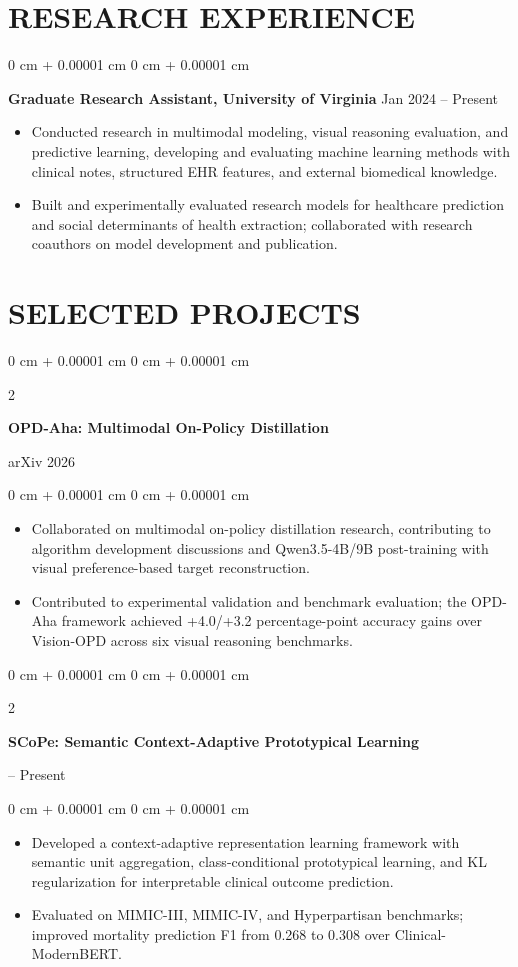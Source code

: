 \documentclass[10pt, letterpaper]{article}
\newenvironment{highlights}{
    \begin{itemize}[
        topsep=0.03 cm,
        parsep=0.03 cm,
        partopsep=0pt,
        itemsep=0pt,
        leftmargin=0 cm + 10pt
    ]
}{
    \end{itemize}
} %
\newenvironment{onecolentry}{
    \begin{adjustwidth}{
        0 cm + 0.00001 cm
    }{
        0 cm + 0.00001 cm
    }
}{
    \end{adjustwidth}
} %
\newenvironment{twocolentry}[2][]{
    \onecolentry
    \def\secondColumn{#2}
    \setcolumnwidth{\fill, 4.5 cm}
    \begin{paracol}{2}
}{
    \switchcolumn \raggedleft \secondColumn
    \end{paracol}
    \endonecolentry
} %
\begin{document}
\section{RESEARCH EXPERIENCE}
\begin{onecolentry}
\textbf{Graduate Research Assistant, University of Virginia} \hfill Jan 2024 -- Present
\begin{highlights}
\item Conducted research in multimodal modeling, visual reasoning evaluation, and predictive learning, developing and evaluating machine learning methods with clinical notes, structured EHR features, and external biomedical knowledge.
\item Built and experimentally evaluated research models for healthcare prediction and social determinants of health extraction; collaborated with research coauthors on model development and publication.
\end{highlights}
\end{onecolentry}
\section{SELECTED PROJECTS}

\begin{twocolentry}{arXiv 2026}
\textbf{OPD-Aha: Multimodal On-Policy Distillation}
\end{twocolentry}
\begin{onecolentry}
\begin{highlights}
\item Collaborated on multimodal on-policy distillation research, contributing to algorithm development discussions and Qwen3.5-4B/9B post-training with visual preference-based target reconstruction.
\item Contributed to experimental validation and benchmark evaluation; the OPD-Aha framework achieved +4.0/+3.2 percentage-point accuracy gains over Vision-OPD across six visual reasoning benchmarks.
\end{highlights}
\end{onecolentry}
\vspace{0.06 cm}

\begin{twocolentry}{2026 -- Present}
\textbf{SCoPe: Semantic Context-Adaptive Prototypical Learning}
\end{twocolentry}
\begin{onecolentry}
\begin{highlights}
\item Developed a context-adaptive representation learning framework with semantic unit aggregation, class-conditional prototypical learning, and KL regularization for interpretable clinical outcome prediction.
\item Evaluated on MIMIC-III, MIMIC-IV, and Hyperpartisan benchmarks; improved mortality prediction F1 from 0.268 to 0.308 over Clinical-ModernBERT.
\end{highlights}
\end{onecolentry}
\vspace{0.06 cm}
\end{document}
